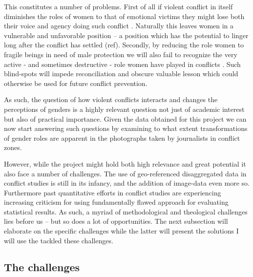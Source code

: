 \documentclass[a4paper]{article}
\begin{document}
This constitutes a number of problems. First of all if violent conflict in itself diminishes the roles of women to that of emotional victims they might lose both their voice and agency doing such conflict \cite{hansen2000gender, hansen2000little}. Naturally this leaves women in a vulnerable and unfavorable position \citep[XXX]{hansen2000little} -- a position which has the potential to linger long after the conflict has settled (ref). Secondly, by reducing the role women to fragile beings in need of male protection we will also fail to recognize the very active - and sometimes destructive - role women have played in conflicts \citep[XXX]{hansen2000gender}. Such blind-spots will impede reconciliation and obscure valuable lesson which could otherwise be used for future conflict prevention.\par

As such, the question of how violent conflicts interacts and changes the perceptions of genders is a highly relevant question not just of academic interest but also of practical importance. Given the data obtained for this project we can now start answering such questions by examining to what extent transformations of gender roles are apparent in the photographs taken by journalists in conflict zones.\par

However, while the project might hold both high relevance and great potential it also face a number of challenges. The use of geo-referenced disaggregated data in conflict studies is still in its infancy, and the addition of image-data even more so. Furthermore past quantitative efforts in conflict studies are experiencing increasing criticism for using fundamentally flawed approach for evaluating statistical results. As such, a myriad of methodological and theological challenges lies before us -- but so does a lot of opportunities. The next subsection will elaborate on the specific challenges while the latter will present the solutions I will use the tackled these challenges.\par


\subsection{The challenges}
\end{document}
